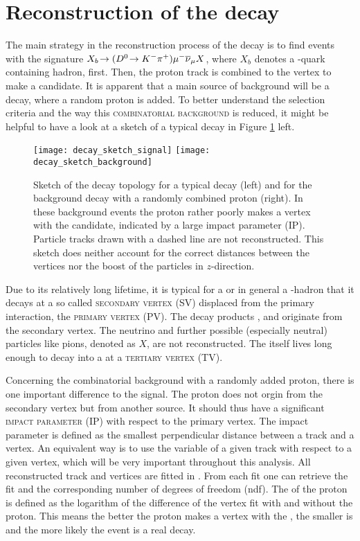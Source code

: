 \section{Reconstruction of the decay \LbToDpmunuX}
The main strategy in the reconstruction process of the decay \LbToDpmunuX is to find events with the signature $X_{b}\!\rightarrow ({{D}^0}\!\rightarrow {\ensuremath{{K}^-}}{\ensuremath{{\pi}^+}}) {\mu^-} {{\overline{\nu}}_\mu} X$, where $X_b$ denotes a \bquark-quark containing hadron, first.
Then, the proton track is combined to the \Dz\mun vertex to make a \LbToDpmunuX candidate.
It is apparent that a main source of background will be a  decay, where a random proton is added.
To better understand the selection criteria and the way this \textsc{combinatorial background} is reduced, it might be helpful to have a look at a sketch of a typical \LbToDpmunuX decay in Figure \ref{fig:DecaySketch} left.
\begin{figure}[tb]
	\centering
	\texttt{[image: decay\_sketch\_signal]}
	\texttt{[image: decay\_sketch\_background]}
	\caption{
        Sketch of the decay topology for a typical \LbToDpmunuX decay (left) and for the background decay  with a randomly combined proton (right).
        In these background events the proton rather poorly makes a vertex with the \Dz\mun candidate, indicated by a large impact parameter (IP).
        Particle tracks drawn with a dashed line are not reconstructed.
        This sketch does neither account for the correct distances between the vertices nor the boost of the particles in $z$-direction.
    }
	\label{fig:DecaySketch}
\end{figure}
Due to its relatively long lifetime, it is typical for a \Lb or in general a \bquark-hadron that it decays at a so called \textsc{secondary vertex (SV)} displaced from the primary \proton\proton interaction, the \textsc{primary vertex (PV)}.
The decay products \Dz, \mun and \proton  originate from the secondary vertex. 
The neutrino and further possible (especially neutral) particles like pions, denoted as $X$, are not reconstructed.
The \Dz itself lives long enough to decay into a \Km\pip at a \textsc{tertiary vertex (TV)}.

Concerning the combinatorial background  with a randomly added proton, there is one important difference to the signal.
The proton does not orgin from the secondary vertex but from another source.
It should thus have a significant \textsc{impact parameter (IP)} with respect to the primary vertex.
The impact parameter is defined as the smallest perpendicular distance between a track and a vertex.
An equivalent way is to use the \logIP variable of a given track with respect to a given vertex, which will be very important throughout this analysis.
All reconstructed track and vertices are fitted in \lhcb.
From each fit one can retrieve the fit \chisq and the corresponding number of degrees of freedom (ndf).
The \logIP of the proton is defined as the logarithm of the difference of the \Dz\mun vertex fit \chisq with and without the proton.
This means the better the proton makes a vertex with the \Dz\mun, the smaller is \logIP and the more likely the event is a real \LbToDpmunuX decay.

